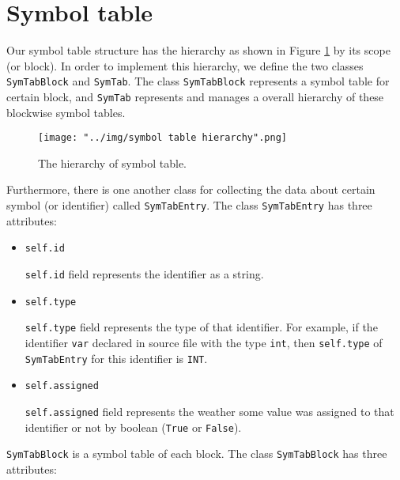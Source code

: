 \documentclass{article}
\newcommand{\code}[1]{\texttt{#1}}
\begin{document}
	\section{Symbol table}
	Our symbol table structure has the hierarchy as shown in Figure \ref{fig: hierarchy of symbol table} by its scope (or block). In order to implement this hierarchy, we define the two classes \code{SymTabBlock} and \code{SymTab}. The class \code{SymTabBlock} represents a symbol table for certain block, and \code{SymTab} represents and manages a overall hierarchy of these blockwise symbol tables.
	
	\begin{figure}[ht]
		\centering
		\texttt{[image: "../img/symbol table hierarchy".png]}
		\caption{The hierarchy of symbol table. \cite{Aho:2006:CPT:1177220}}
		\label{fig: hierarchy of symbol table}
	\end{figure}
	
	Furthermore, there is one another class for collecting the data about certain symbol (or identifier) called \code{SymTabEntry}. The class \code{SymTabEntry} has three attributes:
	
	\begin{itemize}
		\item \code{self.id}
		
		\code{self.id} field represents the identifier as a string.
		
		\item \code{self.type}
		
		\code{self.type} field represents the type of that identifier. For example, if the identifier \code{var} declared in source file with the type \code{int}, then \code{self.type} of \code{SymTabEntry} for this identifier is \code{INT}.
		
		\item \code{self.assigned}
		
		\code{self.assigned} field represents the weather some value was assigned to that identifier or not by boolean (\code{True} or \code{False}).
	\end{itemize}
	
	\code{SymTabBlock} is a symbol table of each block. The class \code{SymTabBlock} has three attributes:
	
\end{document}
